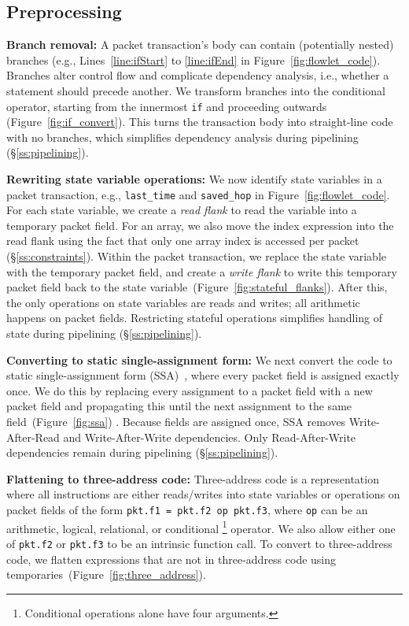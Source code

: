 \subsection{Preprocessing}
\label{ss:preprocessing}

\textbf{Branch removal: }A packet transaction's body can contain (potentially
nested) branches (e.g., Lines~\ref{line:ifStart} to \ref{line:ifEnd} in
Figure~\ref{fig:flowlet_code}).  Branches alter control flow and complicate
dependency analysis, i.e.,  whether a statement should precede another.  We
transform branches into the conditional operator, starting from the innermost
\texttt{if} and proceeding outwards (Figure~\ref{fig:if_convert}).  This turns
the transaction body into straight-line code with no branches, which simplifies
dependency analysis during pipelining (\S\ref{ss:pipelining}).

\textbf{Rewriting state variable operations: }We now identify state variables
in a packet transaction, e.g., \texttt{last\_time} and \texttt{saved\_hop} in
Figure~\ref{fig:flowlet_code}.  For each state variable, we create a
\textit{read flank} to read the variable into a temporary packet field.
For an array, we also move the index expression into the read flank using the
fact that only one array index is accessed per packet (\S\ref{ss:constraints}).
Within the packet transaction, we replace the state variable with the temporary
packet field, and create a \textit{write flank} to write this temporary packet
field back to the state variable~(Figure~\ref{fig:stateful_flanks}). After
this, the only operations on state variables are reads and writes; all
arithmetic happens on packet fields. Restricting stateful operations simplifies
handling of state during pipelining (\S\ref{ss:pipelining}).

\textbf{Converting to static single-assignment form: }We next convert the code
to static single-assignment form (SSA)~\cite{ssa}, where every packet field is
assigned exactly once. We do this by replacing every assignment to a packet
field with a new packet field and propagating this until the next assignment to
the same field~(Figure~\ref{fig:ssa}) .  Because fields are assigned once, SSA
removes Write-After-Read and Write-After-Write dependencies.  Only
Read-After-Write dependencies remain during pipelining (\S\ref{ss:pipelining}).

\textbf{Flattening to three-address code: } Three-address code is a
representation where all instructions are either reads/writes into state
variables or operations on packet fields of the form \texttt{pkt.f1 = pkt.f2 op
pkt.f3}, where \texttt{op} can be an arithmetic, logical, relational, or
conditional \footnote{Conditional operations alone have four arguments.}
operator.  We also allow either one of {\tt pkt.f2} or {\tt pkt.f3} to be an
intrinsic function call.  To convert to three-address code, we flatten
expressions that are not in three-address code using
temporaries~(Figure~\ref{fig:three_address}).

